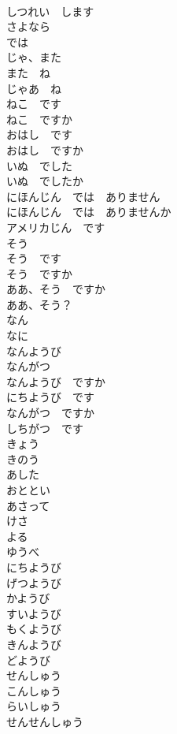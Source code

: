 \documentclass[8pt]{extreport}
\begin{document}
\begin{CJK}{UTF8}{min}
\\	しつれい　します	
\\	さよなら	
\\	では	
\\	じゃ、また	
\\	また　ね	
\\	じゃあ　ね	
\\	ねこ　です	
\\	ねこ　ですか	
\\	おはし　です	
\\	おはし　ですか	
\\	いぬ　でした	
\\	いぬ　でしたか	
\\	にほんじん　では　ありません	
\\	にほんじん　では　ありませんか	
\\	アメリカじん　です	
\\	そう	
\\	そう　です	
\\	そう　ですか	
\\	ああ、そう　ですか	
\\	ああ、そう？	
\\	なん	
\\	なに	
\\	なんようび	
\\	なんがつ	
\\	なんようび　ですか	
\\	にちようび　です	
\\	なんがつ　ですか	
\\	しちがつ　です	
\\	きょう	
\\	きのう	
\\	あした	
\\	おととい	
\\	あさって	
\\	けさ	
\\	よる	
\\	ゆうべ	
\\	にちようび	
\\	げつようび	
\\	かようび	
\\	すいようび	
\\	もくようび	
\\	きんようび	
\\	どようび	
\\	せんしゅう	
\\	こんしゅう	
\\	らいしゅう	
\\	せんせんしゅう	

\end{CJK}
\end{document}
